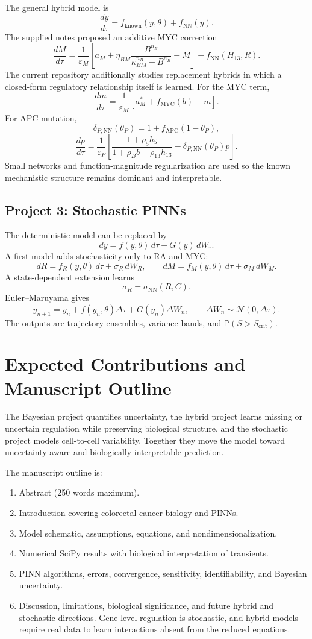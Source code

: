 \documentclass[11pt]{article}
\begin{document}
The general hybrid model is
\[
\frac{dy}{d\tau}
=f_{\mathrm{known}}(y,\theta)+f_{\mathrm{NN}}(y).
\]
The supplied notes proposed an additive MYC correction
\[
\frac{dM}{d\tau}
=
\frac{1}{\varepsilon_M}
\left[
a_M+\eta_{BM}\frac{B^{n_B}}{\kappa_{BM}^{n_B}+B^{n_B}}-M
\right]
+f_{\mathrm{NN}}(H_{13},R).
\]
The current repository additionally studies replacement hybrids in which a
closed-form regulatory relationship itself is learned. For the MYC term,
\[
\boxed{
\frac{dm}{d\tau}
=
\frac{1}{\varepsilon_M}
\left[a_M^*+f_{\mathrm{MYC}}(b)-m\right].
}
\]
For APC mutation,
\[
\boxed{
\delta_{P,\mathrm{NN}}(\theta_P)
=1+f_{\mathrm{APC}}(1-\theta_P),
}
\]
\[
\boxed{
\frac{dp}{d\tau}
=
\frac{1}{\varepsilon_P}
\left[
\frac{1+\rho_5h_5}{1+\rho_Bb+\rho_{13}h_{13}}
-\delta_{P,\mathrm{NN}}(\theta_P)p
\right].
}
\]
Small networks and function-magnitude regularization are used so the known
mechanistic structure remains dominant and interpretable.

\subsection{Project 3: Stochastic PINNs}

The deterministic model can be replaced by
\[
dy=f(y,\theta)\,d\tau+G(y)\,dW_\tau.
\]
A first model adds stochasticity only to RA and MYC:
\[
dR=f_R(y,\theta)\,d\tau+\sigma_R\,dW_R,
\qquad
dM=f_M(y,\theta)\,d\tau+\sigma_M\,dW_M.
\]
A state-dependent extension learns
\[
\sigma_R=\sigma_{\mathrm{NN}}(R,C).
\]
Euler--Maruyama gives
\[
y_{n+1}=y_n+f(y_n,\theta)\Delta\tau+G(y_n)\Delta W_n,
\qquad
\Delta W_n\sim\mathcal N(0,\Delta\tau).
\]
The outputs are trajectory ensembles, variance bands, and
\(\mathbb P(S>S_{\mathrm{crit}})\).

\section{Expected Contributions and Manuscript Outline}

The Bayesian project quantifies uncertainty, the hybrid project learns missing
or uncertain regulation while preserving biological structure, and the
stochastic project models cell-to-cell variability. Together they move the
model toward uncertainty-aware and biologically interpretable prediction.

The manuscript outline is:
\begin{enumerate}
\item Abstract (250 words maximum).
\item Introduction covering colorectal-cancer biology and PINNs.
\item Model schematic, assumptions, equations, and nondimensionalization.
\item Numerical SciPy results with biological interpretation of transients.
\item PINN algorithms, errors, convergence, sensitivity, identifiability, and
Bayesian uncertainty.
\item Discussion, limitations, biological significance, and future hybrid and
stochastic directions. Gene-level regulation is stochastic, and hybrid models
require real data to learn interactions absent from the reduced equations.
\end{enumerate}

\end{document}
